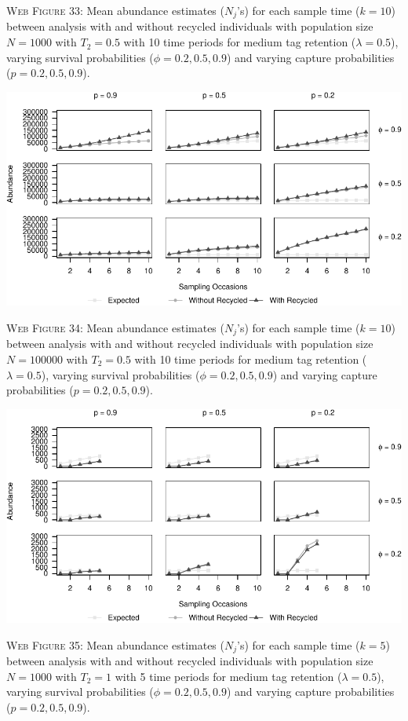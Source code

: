 \documentclass[]{article}
\begin{document}
\textsc{Web Figure 33:} Mean abundance estimates (\(N_j\)'s) for each
sample time (\(k=10\)) between analysis with and without recycled
individuals with population size \(N=1000\) with \(T_2=0.5\) with 10
time periods for medium tag retention (\(\lambda=0.5\)), varying
survival probabilities (\(\phi=0.2,0.5,0.9\)) and varying capture
probabilities (\(p=0.2,0.5,0.9\)).

\includegraphics{Appendix_BW_files/figure-latex/34_abundance_M_GJSTL3-1.pdf}

\textsc{Web Figure 34:} Mean abundance estimates (\(N_j\)'s) for each
sample time (\(k=10\)) between analysis with and without recycled
individuals with population size \(N=100000\) with \(T_2=0.5\) with 10
time periods for medium tag retention (\(\lambda=0.5\)), varying
survival probabilities (\(\phi=0.2,0.5,0.9\)) and varying capture
probabilities (\(p=0.2,0.5,0.9\)).

\newpage

\includegraphics{Appendix_BW_files/figure-latex/35_abundance_M_GJSTL5-1.pdf}

\textsc{Web Figure 35:} Mean abundance estimates (\(N_j\)'s) for each
sample time (\(k=5\)) between analysis with and without recycled
individuals with population size \(N=1000\) with \(T_2=1\) with 5 time
periods for medium tag retention (\(\lambda=0.5\)), varying survival
probabilities (\(\phi=0.2,0.5,0.9\)) and varying capture probabilities
(\(p=0.2,0.5,0.9\)).
\end{document}
